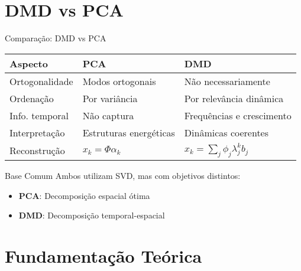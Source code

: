 \documentclass[aspectratio=169]{beamer}
\begin{document}
\section{DMD vs PCA}

\begin{frame}{Comparação: DMD vs PCA}
    \begin{table}[h]
        \centering
        \small
        \begin{tabular}{|l|l|l|}
            \hline
            \textbf{Aspecto} & \textbf{PCA} & \textbf{DMD} \\
            \hline
            Ortogonalidade & Modos ortogonais & Não necessariamente \\
            \hline
            Ordenação & Por variância & Por relevância dinâmica \\
            \hline
            Info. temporal & Não captura & Frequências e crescimento \\
            \hline
            Interpretação & Estruturas energéticas & Dinâmicas coerentes \\
            \hline
            Reconstrução & $x_k = \Phi\alpha_k$ & $x_k = \sum_j \phi_j \lambda_j^k b_j$ \\
            \hline
        \end{tabular}
    \end{table}
    
    \begin{block}{Base Comum}
        Ambos utilizam SVD, mas com objetivos distintos:
        \begin{itemize}
            \item \textbf{PCA}: Decomposição espacial ótima
            \item \textbf{DMD}: Decomposição temporal-espacial
        \end{itemize}
    \end{block}
\end{frame}

\section{Fundamentação Teórica}
\end{document}
